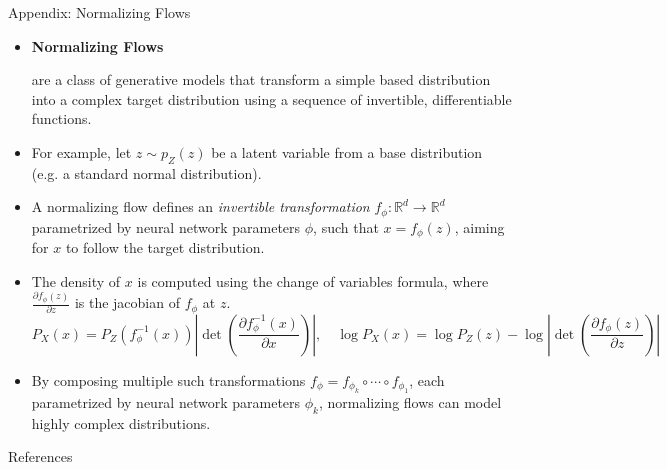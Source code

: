 \documentclass{beamer}
\newcommand{\mbb}[1]{\mathbb{#1}}
\newcommand{\tb}[1]{\textbf{#1}}
\newcommand{\ti}[1]{\textit{#1}}
\newcommand{\abs}[1]{\left\lvert #1 \right\rvert}
\begin{document}
\begin{frame}{Appendix: Normalizing Flows}
    \begin{itemize}
        \item \hypertarget{norm_flow}{\tb{Normalizing Flows}} are a class of generative models that transform a simple based distribution into a complex target distribution using a sequence of invertible, differentiable functions.
        \item For example, let $z \sim p_Z(z)$ be a latent variable from a base distribution (e.g. a standard normal distribution).
        \item A normalizing flow defines an \ti{invertible transformation} $f_\phi: \mbb{R}^d \to \mbb{R}^d$ parametrized by neural network parameters $\phi$, such that $x = f_\phi(z)$, aiming for $x$ to follow the target distribution.
        \item The density of $x$ is computed using the change of variables formula, where $\frac{\partial f_\phi(z)}{\partial z}$ is the jacobian of $f_\phi$ at $z$.
        \[
            P_X(x) = P_Z(f^{-1}_\phi(x)) \abs{\det \left(\frac{\partial f^{-1}_\phi(x)}{\partial x}\right)}, \quad \log P_X(x) = \log P_Z(z) - \log \abs{\det \left(\frac{\partial f_\phi(z)}{\partial z}\right)}
        \]
        \item By composing multiple such transformations $f_\phi = f_{\phi_k} \circ \cdots \circ f_{\phi_1}$, each parametrized by neural network parameters $\phi_k$, normalizing flows can model highly complex distributions.
    \end{itemize}
\end{frame}

\begin{frame}[allowframebreaks]{References}
    \printbibliography
\end{frame}
\end{document}
